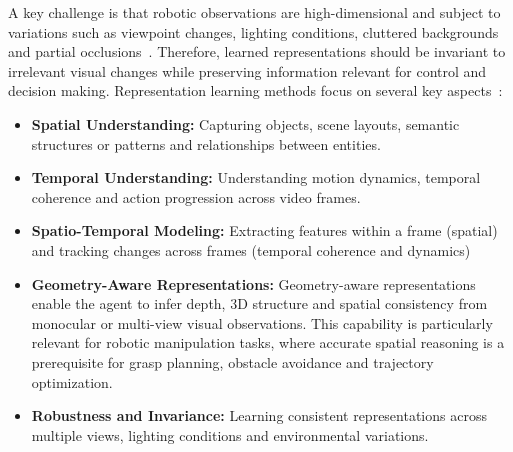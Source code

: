 A key challenge is that robotic observations are high-dimensional and subject to variations such as viewpoint changes, lighting conditions, cluttered backgrounds and partial occlusions~\cite{Eze2024LearningBW}. Therefore, learned representations should be invariant to irrelevant visual changes while preserving information relevant for control and decision making.
Representation learning methods focus on several key aspects~\cite{Eze2024LearningBW}:
\begin{itemize}
    \item \textbf{Spatial Understanding:} Capturing objects, scene layouts, semantic structures or patterns and relationships between entities.
    
    \item \textbf{Temporal Understanding:} Understanding motion dynamics, temporal coherence and action progression across video frames.
    
    \item \textbf{Spatio-Temporal Modeling:} Extracting features within a frame (spatial) and tracking changes across frames (temporal coherence and dynamics)
    
    \item \textbf{Geometry-Aware Representations:} Geometry-aware representations enable the agent to infer depth, 3D structure and spatial consistency from monocular or multi-view visual observations. This capability is particularly relevant for robotic manipulation tasks, where accurate spatial reasoning is a prerequisite for grasp planning, obstacle avoidance and trajectory optimization.
    
    \item \textbf{Robustness and Invariance:} Learning consistent representations across multiple views, lighting conditions and environmental variations.
\end{itemize}


